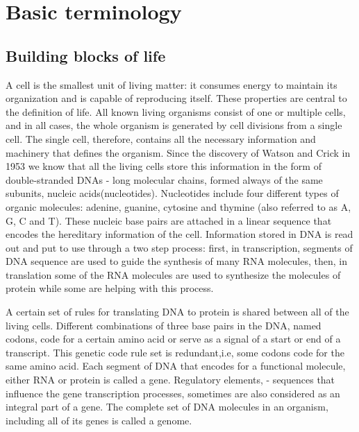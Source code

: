 \documentclass[11pt, a4paper,oneside]{report}
\begin{document}
\section{Basic terminology}
\subsection{Building blocks of life}
A cell is the smallest unit of living matter: it consumes energy to maintain its organization and is capable of reproducing itself. These properties are central to the definition of life. All known living organisms consist of one or multiple cells, and in all cases, the whole organism is generated by cell divisions from a single cell. The single cell, therefore, contains all the necessary information and machinery that defines the organism.  Since the discovery of Watson and Crick in 1953\cite{Watson1974} we know that all the living cells store this information in the form of double-stranded DNAs -  long molecular chains, formed always of the same subunits, nucleic acids(nucleotides). Nucleotides include four different types of organic molecules: adenine, guanine, cytosine and thymine (also referred to as A, G, C and T). These nucleic base pairs are attached  in a linear sequence that encodes the hereditary information of the cell. Information stored in DNA is read out and put to use through a two step process: first, in transcription, segments of DNA sequence are used to guide the synthesis of many RNA molecules, then, in translation some of the RNA molecules are used to synthesize the molecules of protein while some are helping with this process\cite{britannica}.

 A certain set of rules for translating DNA to protein is shared between all of the living cells.  Different combinations of three base pairs in the DNA, named codons, code for a certain amino acid or serve as a signal of a start or end of a transcript. This genetic code rule set is redundant,i.e, some codons code for the same amino acid\cite{Turanov2009}. Each segment of DNA that encodes for a functional molecule, either RNA or protein is called a gene\cite{Gerstein2007}. Regulatory elements, - sequences that influence the gene transcription processes, sometimes are also considered as an integral part of a gene.\cite{lodish2001} The complete set of DNA molecules in an organism, including all of its genes is called a genome.  
 
\end{document}
